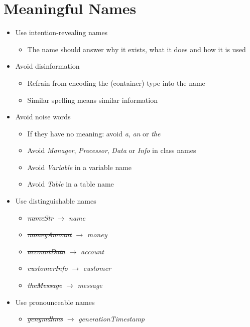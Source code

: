 
\section{Meaningful Names}
\begin{itemize}
    \item Use intention-revealing names
    \begin{itemize}
        \item The name should answer why it exists, what it does and how it is used
    \end{itemize}
    \item Avoid disinformation
    \begin{itemize}
        \item Refrain from encoding the (container) type into the name
        \item Similar spelling means similar information
    \end{itemize}
    \item Avoid noise words
    \begin{itemize}
        \item If they have no meaning: avoid \textit{a}, \textit{an} or \textit{the}
        \item Avoid \textit{Manager}, \textit{Processor}, \textit{Data} or \textit{Info} in class names
        \item Avoid \textit{Variable} in a variable name
        \item Avoid \textit{Table} in a table name
    \end{itemize}
    \item Use distinguishable names
    \begin{itemize}
        \item \st{\textit{nameStr}} $\rightarrow$ \textit{name}
        \item \st{\textit{moneyAmount}} $\rightarrow$ \textit{money}
        \item \st{\textit{accountData}} $\rightarrow$ \textit{account}
        \item \st{\textit{customerInfo}} $\rightarrow$ \textit{customer}
        \item \st{\textit{theMessage}} $\rightarrow$ \textit{message}
    \end{itemize}
    \item Use pronounceable names
    \begin{itemize}
        \item \st{\textit{genymdhms}} $\rightarrow$ \textit{generationTimestamp}

\end{itemize}
\end{itemize}
